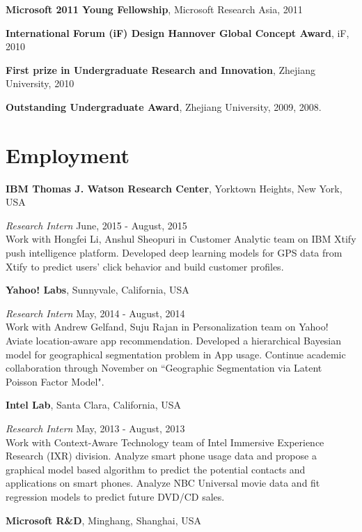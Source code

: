 \documentclass[margin,line]{res}
\begin{document}
\begin{resume}
\textbf{Microsoft 2011 Young Fellowship}, Microsoft Research Asia, 2011


\textbf{International Forum (iF) Design Hannover Global Concept Award}, iF, 2010 

\textbf{First prize in Undergraduate Research and Innovation}, Zhejiang University, 2010   

\textbf{Outstanding Undergraduate Award}, Zhejiang University, 2009, 2008. 

\section{\sc Employment} 
{\bf  IBM Thomas J. Watson Research Center}, Yorktown Heights, New York, USA

\vspace{-.3cm}
{\em Research Intern} \hfill { June, 2015 - August, 2015}\\
Work with Hongfei Li, Anshul Sheopuri in Customer Analytic team on IBM Xtify push intelligence platform. Developed deep learning models for GPS data from Xtify to predict users' click behavior and build customer profiles. 


{\bf  Yahoo! Labs}, Sunnyvale, California, USA

\vspace{-.3cm}
{\em Research Intern} \hfill { May, 2014 - August, 2014}\\
Work with Andrew Gelfand, Suju Rajan in Personalization team on Yahoo! Aviate location-aware app recommendation. Developed a hierarchical Bayesian model for geographical segmentation problem in App usage. Continue academic collaboration through November on ``Geographic Segmentation via Latent Poisson Factor Model".



{\bf  Intel Lab}, Santa Clara, California, USA

\vspace{-.3cm}
{\em Research Intern} \hfill { May, 2013 - August, 2013}\\
Work with Context-Aware Technology team of Intel Immersive Experience Research (IXR) division. 
Analyze smart phone usage data and propose a graphical model based algorithm to predict the potential contacts and applications on smart phones.
Analyze NBC Universal movie data and fit regression models to predict future DVD/CD sales.

{\bf  Microsoft R\&D}, Minghang, Shanghai, USA


\end{resume}
\end{document}
